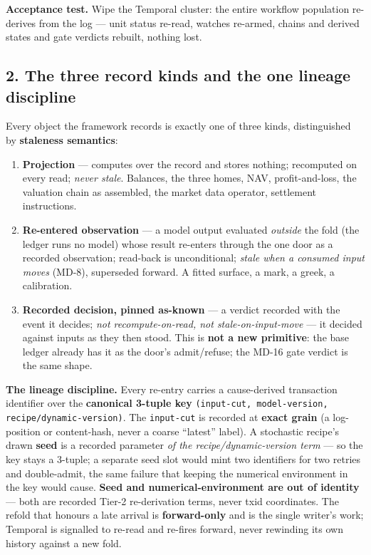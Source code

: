 \documentclass[11pt,a4paper]{article}
\begin{document}
\noindent\textbf{Acceptance test.} Wipe the Temporal cluster: the entire workflow population
re-derives from the log --- unit status re-read, watches re-armed, chains and derived states and
gate verdicts rebuilt, nothing lost.

\subsection*{2. The three record kinds and the one lineage discipline}

Every object the framework records is exactly one of three kinds, distinguished by
\textbf{staleness semantics}:

\begin{enumerate}[leftmargin=*, itemsep=1pt, topsep=2pt]
\item \textbf{Projection} --- computes over the record and stores nothing; recomputed on every
read; \emph{never stale}. Balances, the three homes, NAV, profit-and-loss, the valuation chain as
assembled, the market data operator, settlement instructions.
\item \textbf{Re-entered observation} --- a model output evaluated \emph{outside} the fold (the
ledger runs no model) whose result re-enters through the one door as a recorded observation;
read-back is unconditional; \emph{stale when a consumed input moves} (MD-8), superseded forward. A
fitted surface, a mark, a greek, a calibration.
\item \textbf{Recorded decision, pinned as-known} --- a verdict recorded with the event it decides;
\emph{not recompute-on-read, not stale-on-input-move} --- it decided against inputs as they then
stood. This is \textbf{not a new primitive}: the base ledger already has it as the door's
admit/refuse; the MD-16 gate verdict is the same shape.
\end{enumerate}

\noindent\textbf{The lineage discipline.} Every re-entry carries a cause-derived transaction
identifier over the \textbf{canonical 3-tuple key} \texttt{(input-cut, model-version,
recipe/dynamic-version)}. The \texttt{input-cut} is recorded at \textbf{exact grain} (a log-position
or content-hash, never a coarse ``latest'' label). A stochastic recipe's drawn \textbf{seed} is a
recorded parameter \emph{of the recipe/dynamic-version term} --- so the key stays a 3-tuple; a
separate seed slot would mint two identifiers for two retries and double-admit, the same failure
that keeping the numerical environment in the key would cause. \textbf{Seed and numerical-environment
are out of identity} --- both are recorded Tier-2 re-derivation terms, never txid coordinates. The
refold that honours a late arrival is \textbf{forward-only} and is the single writer's work; Temporal
is signalled to re-read and re-fires forward, never rewinding its own history against a new fold.
\end{document}
